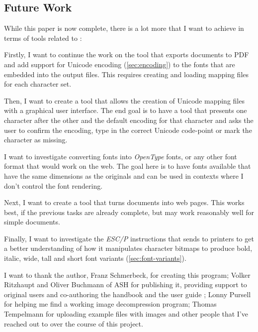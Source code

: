 \subsection*{Future Work}
\label{subsec:conclusion}

While this paper is now complete, there is a lot more that I want to achieve in terms of tools related to \Signum{}:

Firstly, I want to continue the work on the tool that exports documents to PDF and add support for Unicode encoding (\ref{sec:encoding}) to the fonts that are embedded into the output files. This requires creating and loading mapping files for each character set.

Then, I want to create a tool that allows the creation of Unicode mapping files with a graphical user interface. The end goal is to have a tool that presents one character after the other and the default encoding for that character and asks the user to confirm the encoding, type in the correct Unicode code-point or mark the character as missing.

I want to investigate converting \Signum{} fonts into \textit{OpenType} fonts, or any other font format that would work on the web. The goal here is to have fonts available that have the same dimensions as the originals and can be used in contexts where I don't control the font rendering.

Next, I want to create a tool that turns \Signum{} documents into web pages. This works best, if the previous tasks are already complete, but may work reasonably well for simple documents.

Finally, I want to investigate the \textit{ESC/P} instructions that \Signum{} sends to printers to get a better understanding of how it manipulates character bitmaps to produce bold, italic, wide, tall and short font variants (\ref{sec:font-variants}).

{\scriptsize
I want to thank the author, Franz Schmerbeck, for creating this program; Volker Ritzhaupt and Oliver Buchmann of ASH for publishing it, providing support to original users and co-authoring the handbook \cite{schmerbeck1998signum} and the user guide \cite{ritzhaupt1988signum}; Lonny Pursell for helping me find a working image decompression program; Thomas Tempelmann for uploading example files with images and other people that I've reached out to over the course of this project.}

\printglossary[type=\acronymtype]
\printglossary
\listoffigures
\printbibliography
\checkproblems